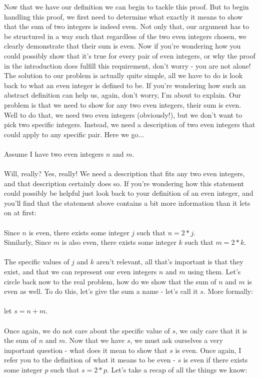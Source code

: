 \documentclass[a4paper,12pt]{article}
\begin{document}
Now that we have our definition we can begin to tackle this proof. But to begin handling this proof, we first need to determine what exactly it means to show that the sum of two integers is indeed even. Not only that, our argument has to be structured in a way such that regardless of the two even integers chosen, we clearly demonstrate that their sum is even. Now if you're wondering how you could possibly show that it's true for every pair of even integers, or why the proof in the introduction does fulfill this requirement, don't worry - you are not alone! The solution to our problem is actually quite simple, all we have to do is look back to what an even integer is defined to be. If you're wondering how such an abstract definition can help us, again, don't worry, I'm about to explain. Our problem is that we need to show for any two even integers, their sum is even. Well to do that, we need two even integers (obviously!), but we don't want to pick two specific integers. Instead, we need a description of two even integers that could apply to any specific pair. Here we go...\\
\\
Assume I have two even integers $n$ and $m$. \\
\\
Will, really? Yes, really! We need a description that fits any two even integers, and that description certainly does so. If you're wondering how this statement could possibly be helpful just look back to your definition of an even integer, and you'll find that the statement above contains a bit more information than it lets on at first: \\
\\
Since $n$ is even, there exists some integer $j$ such that $n = 2*j$. \\
Similarly, Since $m$ is also even, there exists some integer $k$ such that $m = 2*k$. \\
\\
The specific values of $j$ and $k$ aren't relevant, all that's important is that they exist, and that we can represent our even integers $n$ and $m$ using them. Let's circle back now to the real problem, how do we show that the sum of $n$ and $m$ is even as well. To do this, let's give the sum a name - let's call it $s$. More formally:\\ 
\\
let $s = n + m$.\\
\\
Once again, we do not care about the specific value of $s$, we only care that it is the sum of $n$ and $m$. Now that we have $s$, we must ask ourselves a very important question - what does it mean to show that $s$ is even. Once again, I refer you to the definition of what it means to be even - $s$ is even if there exists some integer $p$ such that $s = 2*p$. Let's take a recap of all the things we know:\\
\end{document}
